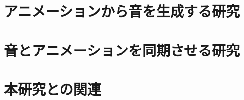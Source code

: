 \section{アニメーションから音を生成する研究}\label{sec:generate_sound}

\section{音とアニメーションを同期させる研究} \label{sec:synchronization}

\section{本研究との関連}\label{sec:compere}




